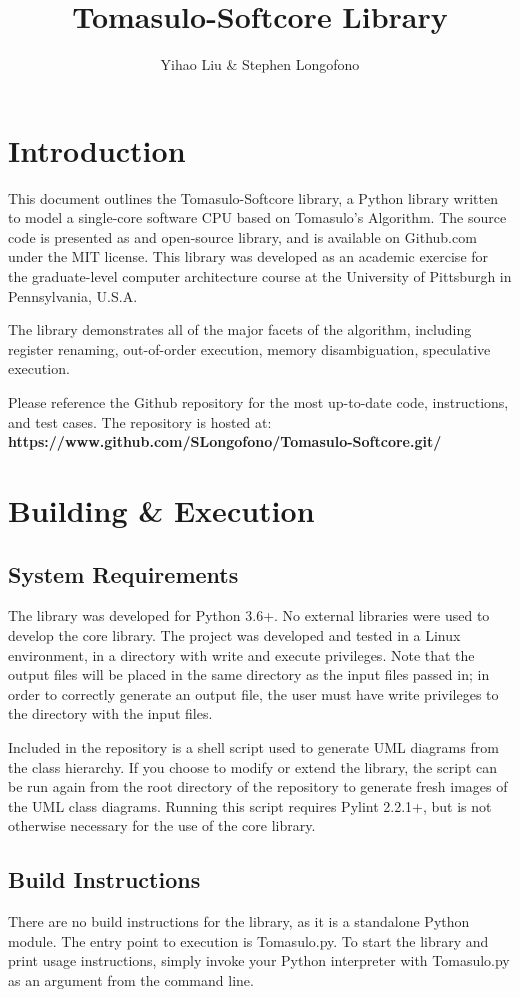 \documentclass[12pt]{article}
\title{Tomasulo-Softcore Library}
\author{Yihao Liu \& Stephen Longofono}
\begin{document}
\maketitle
\section*{Introduction}
This document outlines the Tomasulo-Softcore library, a Python library written to model a single-core software CPU based on Tomasulo's Algorithm.  The source code is presented as and open-source library, and is available on Github.com under the MIT license.  This library was developed as an academic exercise for the graduate-level computer architecture course at the University of Pittsburgh in Pennsylvania, U.S.A.

The library demonstrates all of the major facets of the algorithm, including register renaming, out-of-order execution, memory disambiguation, speculative execution.

Please reference the Github repository for the most up-to-date code, instructions, and test cases.  The repository is hosted at: \\
\textbf{https://www.github.com/SLongofono/Tomasulo-Softcore.git/}

\section{Building \& Execution}
\subsection{System Requirements}
The library was developed for Python 3.6+.  No external libraries were used to develop the core library.  The project was developed and tested in a Linux environment, in a directory with write and execute privileges.  Note that the output files will be placed in the same directory as the input files passed in; in order to correctly generate an output file, the user must have write privileges to the directory with the input files.

Included in the repository is a shell script used to generate UML diagrams from the class hierarchy.  If you choose to modify or extend the library, the script can be run again from the root directory of the repository to generate fresh images of the UML class diagrams.  Running this script requires Pylint 2.2.1+, but is not otherwise necessary for the use of the core library.

\subsection{Build Instructions}
There are no build instructions for the library, as it is a standalone Python module.  The entry point to execution is Tomasulo.py.  To start the library and print usage instructions, simply invoke your Python interpreter with Tomasulo.py as an argument from the command line.
\end{document}
